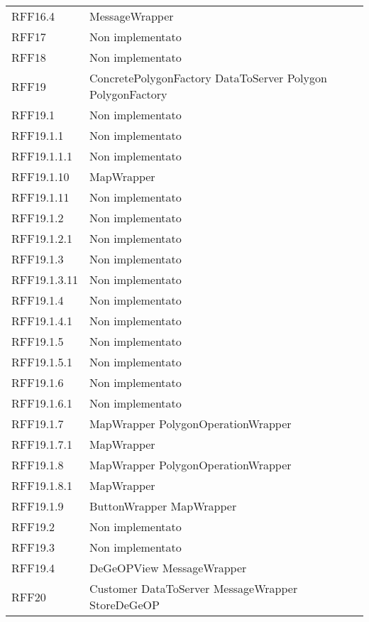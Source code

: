 \begin{longtable}{p{2.5cm}!{\VRule[1pt]}p{5cm}}
	RFF16.4 & MessageWrapper\\
	RFF17 & Non implementato\\
	RFF18 & Non implementato\\
	RFF19 & ConcretePolygonFactory \newline DataToServer \newline Polygon \newline PolygonFactory\\
	RFF19.1 & Non implementato\\
	RFF19.1.1 & Non implementato\\
	RFF19.1.1.1 & Non implementato\\
	RFF19.1.10 & MapWrapper\\
	RFF19.1.11 & Non implementato\\
	RFF19.1.2 & Non implementato\\
	RFF19.1.2.1 & Non implementato\\
	RFF19.1.3 & Non implementato\\
	RFF19.1.3.11 & Non implementato\\
	RFF19.1.4 & Non implementato\\
	RFF19.1.4.1 & Non implementato\\
	RFF19.1.5 & Non implementato\\
	RFF19.1.5.1 & Non implementato\\
	RFF19.1.6 & Non implementato\\
	RFF19.1.6.1 & Non implementato\\
	RFF19.1.7 & MapWrapper \newline PolygonOperationWrapper\\
	RFF19.1.7.1 & MapWrapper\\
	RFF19.1.8 & MapWrapper \newline PolygonOperationWrapper\\
	RFF19.1.8.1 & MapWrapper\\
	RFF19.1.9 & ButtonWrapper \newline MapWrapper\\
	RFF19.2 & Non implementato\\
	RFF19.3 & Non implementato\\
	RFF19.4 & DeGeOPView \newline MessageWrapper\\
	RFF20 & Customer \newline DataToServer \newline MessageWrapper \newline StoreDeGeOP\\

\end{longtable}
